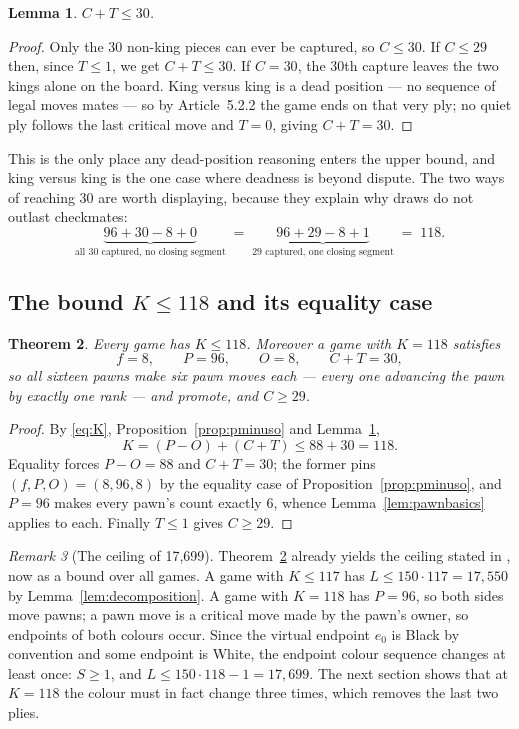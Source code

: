 \documentclass[11pt]{article}
\newtheorem{theorem}{Theorem}[section]
\newtheorem{lemma}[theorem]{Lemma}
\theoremstyle{definition}
\theoremstyle{remark}
\newtheorem{remark}[theorem]{Remark}
\theoremstyle{plain}
\begin{document}
\begin{lemma}\label{lem:ct30}
$C + T \le 30$.
\end{lemma}

\begin{proof}
Only the $30$ non-king pieces can ever be captured, so $C \le 30$. If
$C \le 29$ then, since $T \le 1$, we get $C + T \le 30$. If $C = 30$, the
$30$th capture leaves the two kings alone on the board. King versus king is
a dead position --- no sequence of legal moves mates --- so by
Article~5.2.2 the game ends on that very ply; no quiet ply follows the last
critical move and $T = 0$, giving $C + T = 30$.
\end{proof}

This is the only place any dead-position reasoning enters the upper bound,
and king versus king is the one case where deadness is beyond dispute. The
two ways of reaching $30$ are worth displaying, because they explain why
draws do not outlast checkmates:
\[
  \underbrace{96 + 30 - 8 + 0}_{\text{all $30$ captured, no closing
  segment}} \;=\; \underbrace{96 + 29 - 8 + 1}_{\text{$29$ captured, one
  closing segment}} \;=\; 118 .
\]

\subsection{The bound \texorpdfstring{$K \le 118$}{K <= 118} and its equality case}

\begin{theorem}\label{thm:k118}
Every game has $K \le 118$. Moreover a game with $K = 118$ satisfies
\[
  f = 8, \qquad P = 96, \qquad O = 8, \qquad C + T = 30,
\]
so all sixteen pawns make six pawn moves each --- every one advancing
the pawn by exactly one rank --- and promote, and $C \ge 29$.
\end{theorem}

\begin{proof}
By \eqref{eq:K}, Proposition~\ref{prop:pminuso} and Lemma~\ref{lem:ct30},
\[
  K = (P - O) + (C + T) \le 88 + 30 = 118 .
\]
Equality forces $P - O = 88$ and $C + T = 30$; the former pins
$(f, P, O) = (8, 96, 8)$ by the equality case of
Proposition~\ref{prop:pminuso}, and $P = 96$ makes every pawn's count
exactly $6$, whence Lemma~\ref{lem:pawnbasics} applies to each. Finally
$T \le 1$ gives $C \ge 29$.
\end{proof}

\begin{remark}[The ceiling of 17{,}699]\label{rem:ceiling}
Theorem~\ref{thm:k118} already yields the ceiling stated in
\cite{murphy2020longest}, now as a bound over all games. A game with $K \le 117$ has
$L \le 150 \cdot 117 = 17{,}550$ by Lemma~\ref{lem:decomposition}. A game
with $K = 118$ has $P = 96$, so both sides move pawns; a pawn move is a
critical move made by the pawn's owner, so endpoints of both colours
occur. Since the virtual endpoint $e_0$ is Black by convention and some
endpoint is White, the endpoint colour sequence changes at least once:
$S \ge 1$, and $L \le 150 \cdot 118 - 1 = 17{,}699$. The next section
shows that at $K = 118$ the colour must in fact change three times, which
removes the last two plies.
\end{remark}
\end{document}

